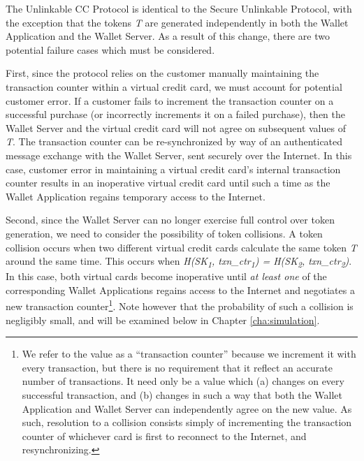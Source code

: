 The Unlinkable CC Protocol is identical to the Secure Unlinkable Protocol,
    with the exception that the tokens \emph{T} are generated independently in both the Wallet Application and the Wallet Server.
As a result of this change, there are two potential failure cases which must be considered.

First, since the protocol relies on the customer manually maintaining the transaction counter within a virtual credit card,
    we must account for potential customer error.
If a customer fails to increment the transaction counter on a successful purchase (or incorrectly increments it on a failed purchase),
    then the Wallet Server and the virtual credit card will not agree on subsequent values of \emph{T}.
The transaction counter can be re-synchronized by way of an authenticated message exchange with the Wallet Server, sent securely over the Internet.
In this case, customer error in maintaining a virtual credit card's internal transaction counter results in an inoperative virtual credit card
    until such a time as the Wallet Application regains temporary access to the Internet.

Second, since the Wallet Server can no longer exercise full control over token generation, we need to consider the possibility of token collisions.
A token collision occurs when two different virtual credit cards calculate the same token \emph{T} around the same time.
This occurs when \emph{H(SK\textsubscript{1}, txn\_ctr\textsubscript{1}) = H(SK\textsubscript{2}, txn\_ctr\textsubscript{2})}.
In this case, both virtual cards become inoperative until \emph{at least one} of the corresponding Wallet Applications regains access to the Internet
    and negotiates a new transaction counter\footnote{
    We refer to the value as a ``transaction counter'' because we increment it with every transaction,
        but there is no requirement that it reflect an accurate number of transactions.
    It need only be a value which (a) changes on every successful transaction, and
        (b) changes in such a way that both the Wallet Application and Wallet Server can independently agree on the new value.
    As such, resolution to a collision consists simply of incrementing the transaction counter of whichever card is first to reconnect to the Internet, and resynchronizing.
    }.
Note however that the probability of such a collision is negligibly small, and will be examined below in Chapter \ref{cha:simulation}.